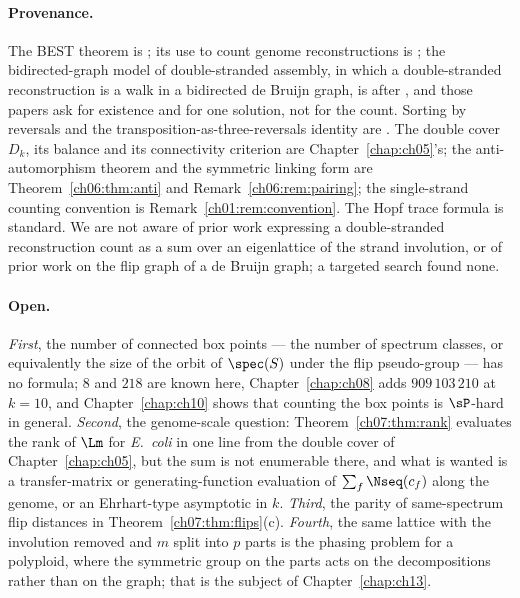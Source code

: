 \paragraph{Provenance.} The BEST theorem is \cite{BEST,SmithTutte}; its use to count genome
reconstructions is \cite{KSP}; the bidirected-graph model of double-stranded assembly, in
which a double-stranded reconstruction is a walk in a bidirected de Bruijn graph, is
\cite{MGMB07} after \cite{KM}, and those papers ask for existence and for one solution, not
for the count. Sorting by reversals and the transposition-as-three-reversals identity are
\cite{BP96,HP99}. The double cover $D_k$, its balance and its connectivity criterion are
Chapter~\ref{chap:ch05}'s; the anti-automorphism theorem and the symmetric linking form are
Theorem~\ref{ch06:thm:anti} and Remark~\ref{ch06:rem:pairing}; the single-strand counting convention
is Remark~\ref{ch01:rem:convention}. The Hopf trace formula is standard. We are
not aware of prior work expressing a double-stranded reconstruction count as a sum over an
eigenlattice of the strand involution, or of prior work on the flip graph of a de Bruijn
graph; a targeted search found none.

\paragraph{Open.} \emph{First}, the number of connected box points --- the number of spectrum
classes, or equivalently the size of the orbit of $\spec(S)$ under the flip pseudo-group ---
has no formula; $8$ and $218$ are known here, Chapter~\ref{chap:ch08} adds $909\,103\,210$ at $k=10$,
and Chapter~\ref{chap:ch10} shows that counting the box points is $\sP$-hard in general. \emph{Second}, the genome-scale question:
Theorem~\ref{ch07:thm:rank} evaluates the rank of $\Lm$ for \emph{E.\ coli} in one line from the
double cover of Chapter~\ref{chap:ch05}, but the sum is not enumerable there, and what is wanted is a
transfer-matrix or generating-function evaluation of $\sum_f\Nseq(c_f)$ along the genome, or
an Ehrhart-type asymptotic in $k$. \emph{Third}, the parity of same-spectrum flip distances in
Theorem~\ref{ch07:thm:flips}(c). \emph{Fourth}, the same lattice with the involution removed and
$m$ split into $p$ parts is the phasing problem for a polyploid, where the symmetric group on
the parts acts on the decompositions rather than on the graph; that is the subject of
Chapter~\ref{chap:ch13}.
